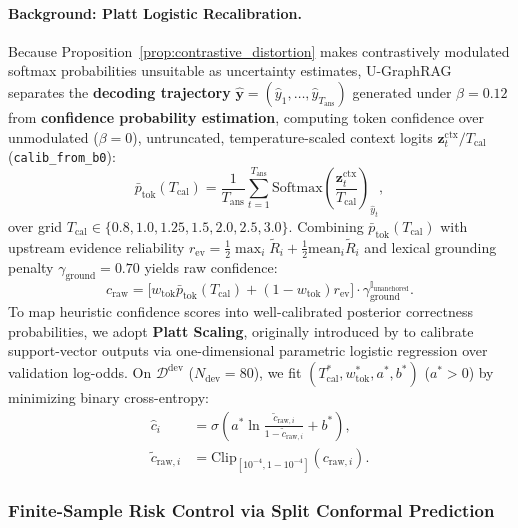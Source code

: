 \documentclass[11pt]{article}
\begin{document}
\paragraph{Background: Platt Logistic Recalibration.}
Because Proposition~\ref{prop:contrastive_distortion} makes contrastively modulated softmax probabilities unsuitable as uncertainty estimates, U-GraphRAG separates the \textbf{decoding trajectory} $\hat{\mathbf{y}} = (\hat{y}_1, \dots, \hat{y}_{T_{\text{ans}}})$ generated under $\beta=0.12$ from \textbf{confidence probability estimation}, computing token confidence over unmodulated ($\beta=0$), untruncated, temperature-scaled context logits $\mathbf{z}_t^{\text{ctx}} / T_{\text{cal}}$ (\texttt{calib\_from\_b0}):
\begin{equation}
\bar{p}_{\text{tok}}(T_{\text{cal}}) = \frac{1}{T_{\text{ans}}} \sum_{t=1}^{T_{\text{ans}}} \text{Softmax}\left(\frac{\mathbf{z}_t^{\text{ctx}}}{T_{\text{cal}}}\right)_{\hat{y}_t},
\label{eq:m3_b0_prob}
\end{equation}
over grid $T_{\text{cal}} \in \{0.8, 1.0, 1.25, 1.5, 2.0, 2.5, 3.0\}$. Combining $\bar{p}_{\text{tok}}(T_{\text{cal}})$ with upstream evidence reliability $r_{\text{ev}} = \frac{1}{2}\max_i \tilde{R}_i + \frac{1}{2}\text{mean}_i \tilde{R}_i$ and lexical grounding penalty $\gamma_{\text{ground}} = 0.70$ yields raw confidence:
\begin{equation}
c_{\text{raw}} = \bigl[w_{\text{tok}}\bar{p}_{\text{tok}}(T_{\text{cal}}) + (1-w_{\text{tok}})r_{\text{ev}}\bigr] \cdot \gamma_{\text{ground}}^{\mathbb{I}_{\text{unanchored}}}.
\label{eq:m3_craw}
\end{equation}
To map heuristic confidence scores into well-calibrated posterior correctness probabilities, we adopt \textbf{Platt Scaling}, originally introduced by \citet{platt1999probabilistic} to calibrate support-vector outputs via one-dimensional parametric logistic regression over validation log-odds. On $\mathcal{D}^{\text{dev}}$ ($N_{\text{dev}}=80$), we fit $(T_{\text{cal}}^*, w_{\text{tok}}^*, a^*, b^*)$ ($a^* > 0$) by minimizing binary cross-entropy:
\begin{align}
\hat{c}_i &= \sigma\left( a^* \ln \frac{\tilde{c}_{\text{raw}, i}}{1 - \tilde{c}_{\text{raw}, i}} + b^* \right), \label{eq:m3_platt} \\
\tilde{c}_{\text{raw}, i} &= \text{Clip}_{[10^{-4}, 1-10^{-4}]}(c_{\text{raw}, i}). \nonumber
\end{align}

\subsubsection{Finite-Sample Risk Control via Split Conformal Prediction}
\end{document}
